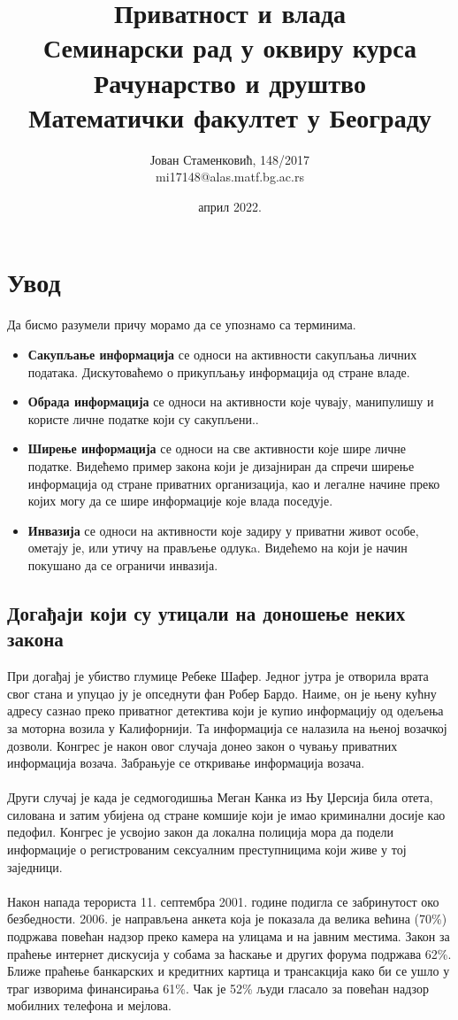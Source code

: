 \documentclass{article}
\title{\Huge{Приватност и влада}\\
{\large{Семинарски рад у оквиру курса\\Рачунарство и друштво \\
        Математички факултет у Београду}}}
\author{Јован Стаменковић, 148/2017\\mi17148@alas.matf.bg.ac.rs}
\date{април 2022.}
\begin{document}
\maketitle

\tableofcontents

\newpage
\section{Увод}

Да бисмо разумели причу морамо да се упознамо са терминима.

\begin{itemize}
  \item \textbf{Сакупљање информација} се односи на активности сакупљања личних података. Дискутоваћемо о прикупљању информација од стране владе.
  \item \textbf{Обрада информација} се односи на активности које чувају, манипулишу и користе личне податке који су сакупљени..
  \item \textbf{Ширење информација} се односи на све активности које шире личне податке. Видећемо пример закона који је дизајниран да спречи ширење информација од стране приватних организација, као и легалне начине преко којих могу да се шире информације које влада поседује.
  \item \textbf{Инвазија} се односи на активности које задиру у приватни живот особе, ометају је, или утичу на прављење одлукa. Видећемо на који је начин покушано да се ограничи инвазија.
\end{itemize}

\subsection{Догађаји који су утицали на доношење неких закона}

При догађај је убиство глумице Ребеке Шафер. Једног јутра је отворила врата свог стана и упуцао ју је опседнути фан Робер Бардо. Наиме, он је њену кућну адресу сазнао преко приватног детектива који је купио информацију од одељења за моторна возила у Калифорнији. Та информација се налазила на њеној возачкој дозволи. Конгрес је након овог случаја донео закон о чувању приватних информација возача. Забрањује се откривање информација возача.
\\\\
Други случај је када је седмогодишња Меган Канка из Њу Џерсија била отета, силована и затим убијена од стране комшије који је имао криминални досије као педофил. Конгрес је усвојио закон да локална полиција мора да подели информације о регистрованим сексуалним преступницима који живе у тој заједници.
\\\\
Након напада терориста 11. септембра 2001. године подигла се забринутост око безбедности. 2006. је направљена анкета која је показала да велика већина (70\%) подржава повећан надзор преко камера на улицама и на јавним местима. Закон за праћење интернет дискусија у собама за ћаскање и других форума подржава 62\%. Ближе праћење банкарских и кредитних картица и трансакција како би се ушло у траг изворима финансирања 61\%. Чак је 52\% људи гласало за повећан надзор мобилних телефона и мејлова.
\end{document}

